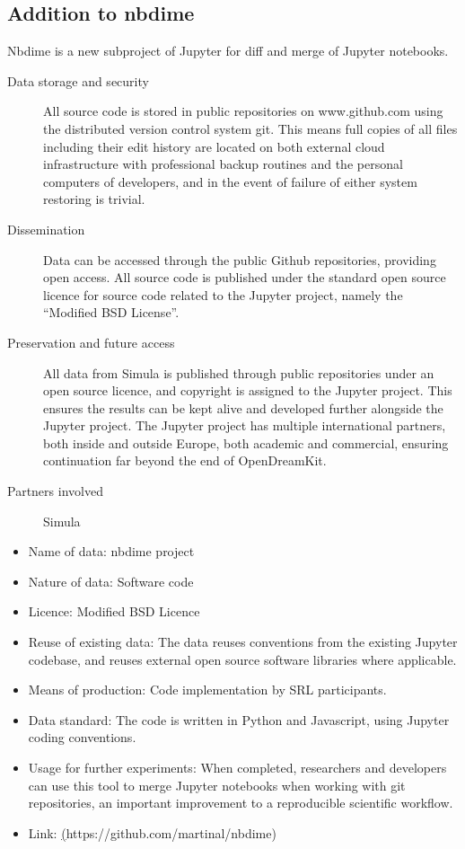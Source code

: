 \documentclass[12pt]{article}
\begin{document}
\subsection{Addition to nbdime}

Nbdime is a new subproject of Jupyter for diff and merge of Jupyter notebooks.
\begin{description}

\item[Data storage and security] All source code is stored in public
  repositories on www.github.com using the distributed version control
  system git. This means full copies of all files including their edit
  history are located on both external cloud infrastructure with
  professional backup routines and the personal computers of
  developers, and in the event of failure of either system restoring
  is trivial.
\item[Dissemination] Data can be accessed through the public Github
  repositories, providing open access. All source code is published
  under the standard open source licence for source code related to
  the Jupyter project, namely the ``Modified BSD License''.
\item[Preservation and future access] All data from Simula is published
  through public repositories under an open source licence, and
  copyright is assigned to the Jupyter project. This ensures the
  results can be kept alive and developed further alongside the
  Jupyter project. The Jupyter project has multiple international
  partners, both inside and outside Europe, both academic and
  commercial, ensuring continuation far beyond the end of
  OpenDreamKit.
\item[Partners involved] Simula

\end{description}

	\begin{itemize}
	\item{Name of data:} nbdime project
	\item{Nature of data:} Software code
	\item{Licence:} Modified BSD Licence
	\item{Reuse of existing data:} The data reuses conventions from the existing Jupyter codebase, and reuses external open source software libraries where applicable.
	\item{Means of production:} Code implementation by SRL participants.
	\item{Data standard:} The code is written in Python and Javascript, using Jupyter coding conventions.
	\item{Usage for further experiments:} When completed, researchers and developers can use this tool to merge Jupyter notebooks when working with git repositories, an important improvement to a reproducible scientific workflow.
	\item{Link:} \href{https://github.com/martinal/nbdime}(https://github.com/martinal/nbdime)
	\end{itemize}
\end{document}
